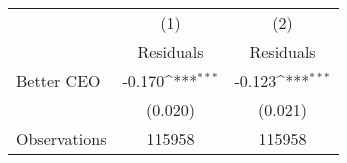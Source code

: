 {
\def\sym#1{\ifmmode^{#1}\else\(^{#1}\)\fi}
\begin{tabular}{l*{2}{c}}
\hline\hline
                    &\multicolumn{1}{c}{(1)}&\multicolumn{1}{c}{(2)}\\
                    &\multicolumn{1}{c}{Residuals}&\multicolumn{1}{c}{Residuals}\\
\hline
Better CEO          &      -0.170\sym{***}&      -0.123\sym{***}\\
                    &     (0.020)         &     (0.021)         \\
\hline
Observations        &      115958         &      115958         \\
\hline\hline
\end{tabular}
}
